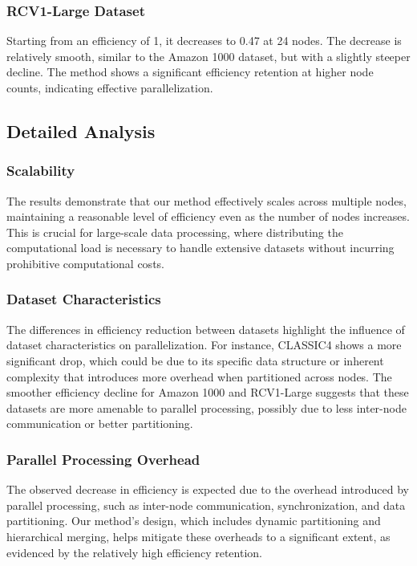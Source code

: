 \documentclass[journal]{IEEEtran}
\begin{document}
\subsubsection{RCV1-Large Dataset}
Starting from an efficiency of 1, it decreases to 0.47 at 24 nodes. The decrease is relatively smooth, similar to the Amazon 1000 dataset, but with a slightly steeper decline. The method shows a significant efficiency retention at higher node counts, indicating effective parallelization.

\subsection{Detailed Analysis}

\subsubsection{Scalability}
The results demonstrate that our method effectively scales across multiple nodes, maintaining a reasonable level of efficiency even as the number of nodes increases. This is crucial for large-scale data processing, where distributing the computational load is necessary to handle extensive datasets without incurring prohibitive computational costs.

\subsubsection{Dataset Characteristics}
The differences in efficiency reduction between datasets highlight the influence of dataset characteristics on parallelization. For instance, CLASSIC4 shows a more significant drop, which could be due to its specific data structure or inherent complexity that introduces more overhead when partitioned across nodes. The smoother efficiency decline for Amazon 1000 and RCV1-Large suggests that these datasets are more amenable to parallel processing, possibly due to less inter-node communication or better partitioning.

\subsubsection{Parallel Processing Overhead}
The observed decrease in efficiency is expected due to the overhead introduced by parallel processing, such as inter-node communication, synchronization, and data partitioning. Our method's design, which includes dynamic partitioning and hierarchical merging, helps mitigate these overheads to a significant extent, as evidenced by the relatively high efficiency retention.
\end{document}
